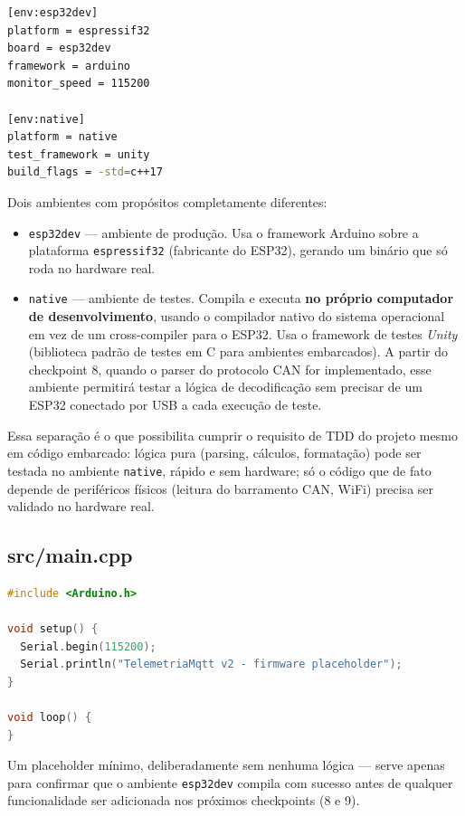 \documentclass[11pt,a4paper]{article}
\begin{document}
\begin{lstlisting}[language=bash,caption={firmware/platformio.ini}]
[env:esp32dev]
platform = espressif32
board = esp32dev
framework = arduino
monitor_speed = 115200

[env:native]
platform = native
test_framework = unity
build_flags = -std=c++17
\end{lstlisting}

Dois ambientes com propósitos completamente diferentes:

\begin{itemize}
    \item \texttt{esp32dev} --- ambiente de produção. Usa o framework Arduino sobre a plataforma \texttt{espressif32} (fabricante do ESP32), gerando um binário que só roda no hardware real.
    \item \texttt{native} --- ambiente de testes. Compila e executa \textbf{no próprio computador de desenvolvimento}, usando o compilador nativo do sistema operacional em vez de um cross-compiler para o ESP32. Usa o framework de testes \textit{Unity} (biblioteca padrão de testes em C para ambientes embarcados). A partir do checkpoint 8, quando o parser do protocolo CAN for implementado, esse ambiente permitirá testar a lógica de decodificação sem precisar de um ESP32 conectado por USB a cada execução de teste.
\end{itemize}

Essa separação é o que possibilita cumprir o requisito de TDD do projeto mesmo em código embarcado: lógica pura (parsing, cálculos, formatação) pode ser testada no ambiente \texttt{native}, rápido e sem hardware; só o código que de fato depende de periféricos físicos (leitura do barramento CAN, WiFi) precisa ser validado no hardware real.

\subsection{src/main.cpp}

\begin{lstlisting}[language=Cpp,caption={firmware/src/main.cpp}]
#include <Arduino.h>

void setup() {
  Serial.begin(115200);
  Serial.println("TelemetriaMqtt v2 - firmware placeholder");
}

void loop() {
}
\end{lstlisting}

Um placeholder mínimo, deliberadamente sem nenhuma lógica --- serve apenas para confirmar que o ambiente \texttt{esp32dev} compila com sucesso antes de qualquer funcionalidade ser adicionada nos próximos checkpoints (8 e 9).
\end{document}
